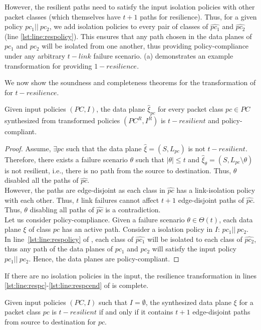 However, the resilient paths need to satisfy the input isolation policies with other 
packet classes (which themselves have $t+1$ paths for resilience). Thus, for a 
given policy $pc_1 || ~pc_2$, we add isolation policies to every pair of 
classes of $\hat{pc_1}$ and $\hat{pc_2}$ (line \ref{lst:line:respolicy}). This ensures that any path 
chosen in the data planes of $pc_1$ and $pc_2$ will be isolated from one 
another, thus providing policy-compliance under any arbitrary $t-link$ failure
scenario. (a) demonstrates an example transformation for providing $1-resilience$. 

We now show the soundness and completeness theorems for the 
transformation of  for $t-resilience$. 
\begin{theorem}[Soundness]
Given input policies $(PC, I)$, 
the data plane $\hat{\xi}_{pc}$ for every packet class $pc \in PC$
 synthesized from
transformed policies $(PC^R, I^R)$  is $t-resilient$ 
	and policy-compliant. 
\end{theorem}
\iffull
\begin{proof}
		Assume, $\exists pc$ such that the data plane $\hat{\xi} = (S, L_{pc})$
		is not $t-resilient$. 
		Therefore, there exists a failure scenario $\theta$ such that $|\theta| \leq t$ 
		and $\hat{\xi}_\theta = (S, L_{pc} \setminus \theta)$ 
		is not resilient, i.e., there is no path from the source to destination. 
		Thus, $\theta$ disabled all the paths of $\hat{pc}$. \\
		However, the paths are
		edge-disjoint as each class in $\hat{pc}$ has a link-isolation policy with each 
		other. Thus, $t$ link failures cannot affect $t+1$ 
		edge-disjoint paths of $\hat{pc}$. Thus, $\theta$ disabling all paths of
		$\hat{pc}$ is a contradiction. \\
		Let us consider policy-compliance. Given a failure scenario $\theta \in \Theta(t)$, each data plane $\xi$ of class $pc$ has an active path. Consider a isolation policy in $I$: $pc_1 || \ pc_2$. In line~\ref{lst:line:respolicy} of , each class of $\hat{pc_1}$ will be isolated to
		each class of $\hat{pc_2}$, thus any path of the data planes of $pc_1$ and
		$pc_2$ will satisfy the input policy $pc_1 || \ pc_2$. Hence, the data planes 
		are policy-compliant. 
	\end{proof}
	\fi
\noindent If there are no isolation policies in the input, the resilience transformation in lines 
\ref{lst:line:respc}-\ref{lst:line:respcend} of  is complete.
\begin{theorem}[Completeness]
Given input policies $(PC,I)$ such that $I=\emptyset$,
the synthesized data plane $\xi$ for a packet class $pc$  
is $t-resilient$ if and only if it 
contains $t + 1$ edge-disjoint paths from source to destination
for $pc$.
\end{theorem}
